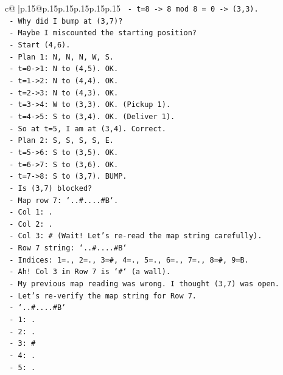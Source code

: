 \documentclass{article}
\begin{document}
{\begin{supertabular}{c@{$\;$}|p{.15\linewidth}@{}p{.15\linewidth}p{.15\linewidth}p{.15\linewidth}p{.15\linewidth}p{.15\linewidth}}
{{{\texttt{    {-} t=8 {-}> 8 mod 8 = 0 {-}> (3,3).} \\
\texttt{  {-} Why did I bump at (3,7)?} \\
\texttt{  {-} Maybe I miscounted the starting position?} \\
\texttt{  {-} Start (4,6).} \\
\texttt{  {-} Plan 1: N, N, N, W, S.} \\
\texttt{    {-} t=0{-}>1: N to (4,5). OK.} \\
\texttt{    {-} t=1{-}>2: N to (4,4). OK.} \\
\texttt{    {-} t=2{-}>3: N to (4,3). OK.} \\
\texttt{    {-} t=3{-}>4: W to (3,3). OK. (Pickup 1).} \\
\texttt{    {-} t=4{-}>5: S to (3,4). OK. (Deliver 1).} \\
\texttt{  {-} So at t=5, I am at (3,4). Correct.} \\
\texttt{  {-} Plan 2: S, S, S, S, E.} \\
\texttt{    {-} t=5{-}>6: S to (3,5). OK.} \\
\texttt{    {-} t=6{-}>7: S to (3,6). OK.} \\
\texttt{    {-} t=7{-}>8: S to (3,7). BUMP.} \\
\texttt{  {-} Is (3,7) blocked?} \\
\texttt{  {-} Map row 7: `..\#....\#B`.} \\
\texttt{    {-} Col 1: .} \\
\texttt{    {-} Col 2: .} \\
\texttt{    {-} Col 3: \# (Wait! Let's re{-}read the map string carefully).} \\
\texttt{    {-} Row 7 string: `..\#....\#B`} \\
\texttt{    {-} Indices: 1=., 2=., 3=\#, 4=., 5=., 6=., 7=., 8=\#, 9=B.} \\
\texttt{    {-} Ah! Col 3 in Row 7 is `\#` (a wall).} \\
\texttt{    {-} My previous map reading was wrong. I thought (3,7) was open.} \\
\texttt{    {-} Let's re{-}verify the map string for Row 7.} \\
\texttt{    {-} `..\#....\#B`} \\
\texttt{    {-} 1: .} \\
\texttt{    {-} 2: .} \\
\texttt{    {-} 3: \#} \\
\texttt{    {-} 4: .} \\
\texttt{    {-} 5: .} \\
}}}
\end{supertabular}}
\end{document}
